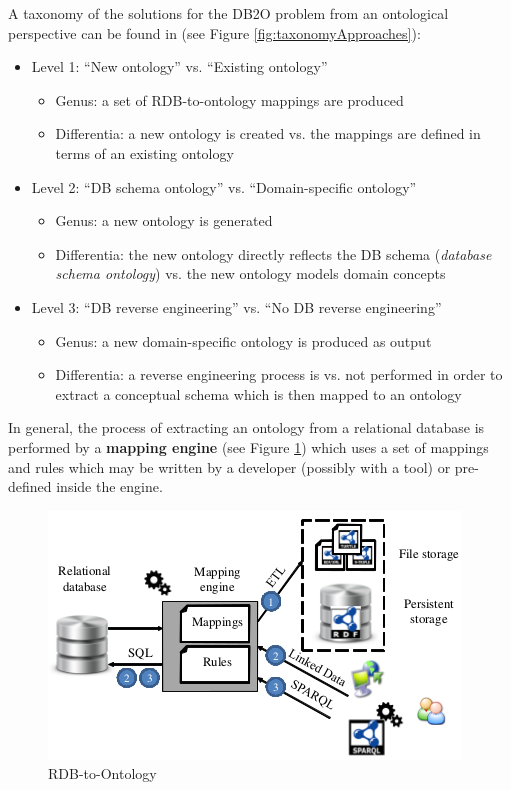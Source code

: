 \documentclass[11pt]{llncs}
\begin{document}
 A taxonomy of the solutions for the DB2O problem from an ontological perspective can be found in \cite{bringingRDBS}
  (see Figure \ref{fig:taxonomyApproaches}):
\begin{itemize}
 \item Level 1: ``New ontology'' vs. ``Existing ontology''
 \begin{itemize}
    \item Genus: a set of RDB-to-ontology mappings are produced
    \item Differentia: a new ontology is created vs. the mappings are defined in terms of an existing ontology
 \end{itemize}

 \item Level 2: ``DB schema ontology'' vs. ``Domain-specific ontology''
 \begin{itemize}
    \item Genus: a new ontology is generated
    \item Differentia: the new ontology directly reflects the DB schema (\emph{database schema ontology}) vs. 
     the new ontology models domain concepts
 \end{itemize} 
 
 \item Level 3: ``DB reverse engineering'' vs. ``No DB reverse engineering''
 \begin{itemize}
    \item Genus: a new domain-specific ontology is produced as output
    \item Differentia: a reverse engineering process is vs. not performed in order to extract a conceptual schema which is then 
     mapped to an ontology
 \end{itemize} 
 
\end{itemize}
  
 In general, the process of extracting an ontology from a relational database is performed by a \textbf{mapping engine} 
 (see Figure \ref{fig:rdb2ont})
  which uses a set of mappings and rules which may be written by a developer (possibly with a tool) or 
  pre-defined inside the engine.
  
 \begin{figure}[H]
 \centering
 \includegraphics[scale = 0.75]{img/rdb2ontology.png}
 \caption{RDB-to-Ontology \cite{bringingRDBS}}
 \label{fig:rdb2ont}
\end{figure}  
\end{document}
